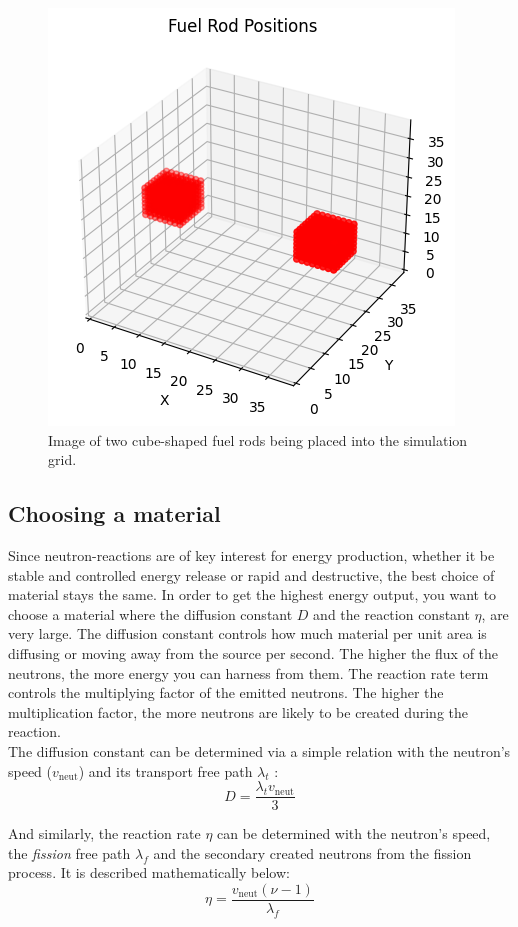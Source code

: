 \documentclass[letterpaper, 12pt]{article}
\begin{document}
      \begin{figure}[h!]
         \centering
         \includegraphics[width=0.4\linewidth]{Graphs/Graph_FuelRodsInGrid.png}
         \caption{Image of two cube-shaped fuel rods being placed into the simulation grid.}
      \end{figure}

      \subsection{Choosing a material}
         Since neutron-reactions are of key interest for energy production, whether it be stable and controlled energy release or rapid and destructive, the best choice of material stays the same. In order to get the highest energy output, you want to choose a material where the diffusion constant $D$ and the reaction constant $\eta$, are very large. The diffusion constant controls how much material per unit area is diffusing or moving away from the source per second. The higher the flux of the neutrons, the more energy you can harness from them. The reaction rate term controls the multiplying factor of the emitted neutrons. The higher the multiplication factor, the more neutrons are likely to be created during the reaction.\\

         The diffusion constant can be determined via a simple relation with the neutron's speed ($v_{\text{neut}}$) and its transport free path $\lambda_t$ \cite{Griffiths_2020}:
         \begin{equation}
            D = \frac{\lambda_t v_{\text{neut}}}{3}
         \end{equation}

         And similarly, the reaction rate $\eta$ can be determined with the neutron's speed, the \textit{fission} free path $\lambda_f$ and the secondary created neutrons from the fission process. It is described mathematically below:
         \begin{equation}
            \eta = \frac{v_{\text{neut}} \left( \nu - 1 \right)}{\lambda_f}
         \end{equation}
\end{document}
